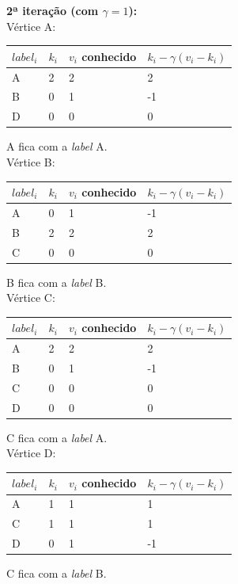 \documentclass[a4paper,10pt]{report}
\begin{document}
  \newpage
  
  {\bf 2ª iteração (com $\gamma=1$):}
\\[0.25cm]
Vértice A:
  \begin{tabular}{| l | l | l | l |}
  \hline
  $label_i$ & $k_i$ & $v_i$ conhecido & $k_i - \gamma(v_i - k_i)$\\ \hline
  A & 2 & 2 & 2 \\ \hline
  B & 0 & 1 & -1 \\ \hline
  D & 0 & 0 & 0 \\ \hline
  \end{tabular}
  A fica com a \textit{label} A.
\\[0.25cm]
Vértice B:
  \begin{tabular}{| l | l | l | l |}
  \hline
  $label_i$ & $k_i$ & $v_i$ conhecido & $k_i - \gamma(v_i - k_i)$\\ \hline
  A & 0 & 1 & -1 \\ \hline
  B & 2 & 2 & 2 \\ \hline
  C & 0 & 0 & 0 \\ \hline
  \end{tabular}
  B fica com a \textit{label} B.
\\[0.25cm]
Vértice C:
  \begin{tabular}{| l | l | l | l |}
  \hline
  $label_i$ & $k_i$ & $v_i$ conhecido & $k_i - \gamma(v_i - k_i)$\\ \hline
  A & 2 & 2 & 2 \\ \hline
  B 	& 0 & 1 & -1 \\ \hline
  C & 0 & 0 & 0 \\ \hline
  D & 0 & 0 & 0 \\ \hline
  \end{tabular}
  C fica com a \textit{label} A.
\\[0.25cm]
Vértice D:
  \begin{tabular}{| l | l | l | l |}
  \hline
  $label_i$ & $k_i$ & $v_i$ conhecido & $k_i - \gamma(v_i - k_i)$\\ \hline
  A & 1 & 1 & 1 \\ \hline
  C & 1 & 1 & 1 \\ \hline
  D & 0 & 1 & -1 \\ \hline
  \end{tabular}
  C fica com a \textit{label} B.
  
\end{document}
